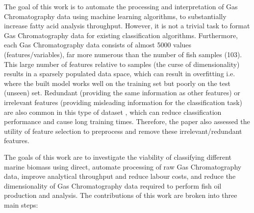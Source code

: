 \documentclass[runningheads]{llncs}
\begin{document}

The goal of this work is to automate the processing and interpretation of Gas Chromatography data using machine learning algorithms, to substantially increase fatty acid analysis throughput. 
However, it is not a trivial task to format Gas Chromatography data for existing classification algorithms. 
Furthermore, each Gas Chromatography data consists of almost 5000 values (features/variables), far more numerous than the number of fish samples (103). 
This large number of features relative to samples (the curse of dimensionality) results in a sparsely populated data space, which can result in overfitting i.e. where the built model works well on the training set but poorly on the test (unseen) set. 
Redundant (providing the same information as other features) or irrelevant features (providing misleading information for the classification task) are also common in this type of dataset \cite{nguyen2020survey}, which can reduce classification performance and cause long training times. 
Therefore, the paper also assessed the utility of feature selection to preprocess and remove these irrelevant/redundant features.

The goals of this work are to investigate the viability of classifying different marine biomass using direct, automate processing of raw Gas Chromatography data, improve analytical throughput and reduce labour costs, and reduce the dimensionality of Gas Chromatography data required to perform fish oil production and analysis. 
The contributions of this work are broken into three main steps:
\end{document}
